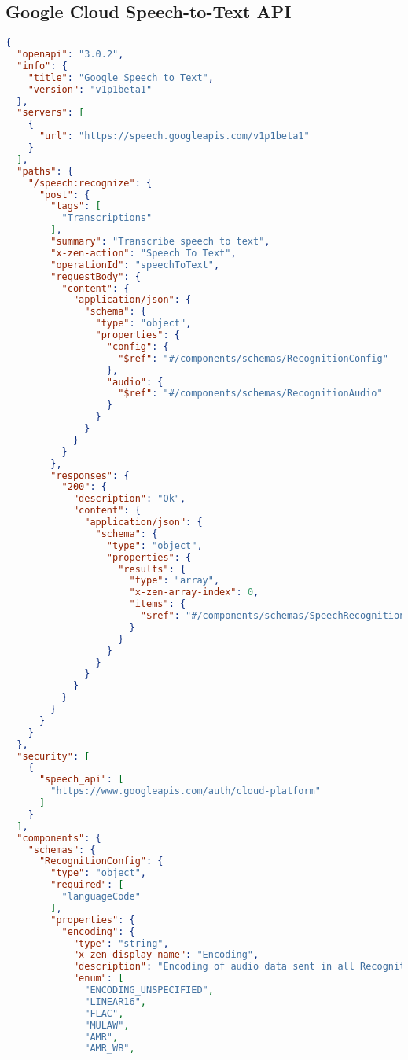 \subsection{Google Cloud Speech-to-Text API}
\begin{lstlisting}[language=json,basicstyle=\ttfamily\tiny,numberstyle=\tiny]
{
  "openapi": "3.0.2",
  "info": {
    "title": "Google Speech to Text",
    "version": "v1p1beta1"
  },
  "servers": [
    {
      "url": "https://speech.googleapis.com/v1p1beta1"
    }
  ],
  "paths": {
    "/speech:recognize": {
      "post": {
        "tags": [
          "Transcriptions"
        ],
        "summary": "Transcribe speech to text",
        "x-zen-action": "Speech To Text",
        "operationId": "speechToText",
        "requestBody": {
          "content": {
            "application/json": {
              "schema": {
                "type": "object",
                "properties": {
                  "config": {
                    "$ref": "#/components/schemas/RecognitionConfig"
                  },
                  "audio": {
                    "$ref": "#/components/schemas/RecognitionAudio"
                  }
                }
              }
            }
          }
        },
        "responses": {
          "200": {
            "description": "Ok",
            "content": {
              "application/json": {
                "schema": {
                  "type": "object",
                  "properties": {
                    "results": {
                      "type": "array",
                      "x-zen-array-index": 0,
                      "items": {
                        "$ref": "#/components/schemas/SpeechRecognitionResult"
                      }
                    }
                  }
                }
              }
            }
          }
        }
      }
    }
  },
  "security": [
    {
      "speech_api": [
        "https://www.googleapis.com/auth/cloud-platform"
      ]
    }
  ],
  "components": {
    "schemas": {
      "RecognitionConfig": {
        "type": "object",
        "required": [
          "languageCode"
        ],
        "properties": {
          "encoding": {
            "type": "string",
            "x-zen-display-name": "Encoding",
            "description": "Encoding of audio data sent in all RecognitionAudio messages. This field is optional for FLAC and WAV audio files and required for all other audio formats.",
            "enum": [
              "ENCODING_UNSPECIFIED", 
              "LINEAR16", 
              "FLAC", 
              "MULAW",
              "AMR",
              "AMR_WB",

\end{lstlisting}
